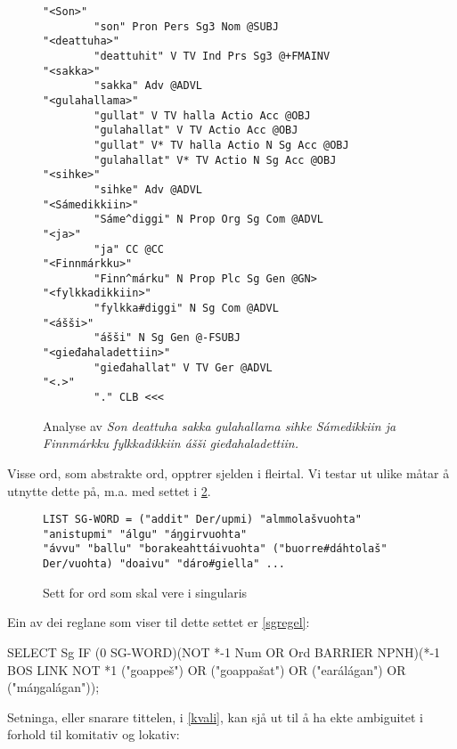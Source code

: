 \documentclass[a4paper,norsk]{article}
\begin{document}
\begin{figure}[htbp]
\begin{center}
\begin{verbatim}
"<Son>"
        "son" Pron Pers Sg3 Nom @SUBJ
"<deattuha>"
        "deattuhit" V TV Ind Prs Sg3 @+FMAINV
"<sakka>"
        "sakka" Adv @ADVL
"<gulahallama>"
        "gullat" V TV halla Actio Acc @OBJ
        "gulahallat" V TV Actio Acc @OBJ
        "gullat" V* TV halla Actio N Sg Acc @OBJ
        "gulahallat" V* TV Actio N Sg Acc @OBJ
"<sihke>"
        "sihke" Adv @ADVL
"<Sámedikkiin>"
        "Sáme^diggi" N Prop Org Sg Com @ADVL
"<ja>"
        "ja" CC @CC
"<Finnmárkku>"
        "Finn^márku" N Prop Plc Sg Gen @GN>
"<fylkkadikkiin>"
        "fylkka#diggi" N Sg Com @ADVL
"<ášši>"
        "ášši" N Sg Gen @-FSUBJ
"<gieđahaladettiin>"
        "gieđahallat" V TV Ger @ADVL
"<.>"
        "." CLB <<<
\end{verbatim}

\caption{Analyse av \emph{Son deattuha sakka gulahallama sihke Sámedikkiin ja Finnmárkku fylkkadikkiin ášši gieđahaladettiin.}}
\label{fylkeanalyse}
\end{center}
\end{figure}

Visse ord, som abstrakte ord, opptrer sjelden i fleirtal. Vi testar ut ulike måtar å utnytte dette på, m.a. med settet i \ref{sgwds}. %


\begin{figure}[htbp]
\begin{center}
\begin{verbatim}
LIST SG-WORD = ("addit" Der/upmi) "almmolašvuohta" "anistupmi" "álgu" "áŋgirvuohta" 
"ávvu" "ballu" "borakeahttáivuohta" ("buorre#dáhtolaš" Der/vuohta) "doaivu" "dáro#giella" ...
\end{verbatim}
\caption{Sett for ord som skal vere i singularis}
\label{sgwds}
\end{center}
\end{figure}

Ein av dei reglane  som viser til dette settet er \ref{sgregel}: %

\begin{example}\label{sgregel}
SELECT Sg IF (0 SG-WORD)(NOT *-1 Num OR Ord BARRIER NPNH)(*-1 BOS LINK NOT *1 ("goappeš") OR ("goappašat") OR ("earálágan") OR ("máŋgalágan"));
\end{example}

Setninga, eller snarare tittelen, i \ref{kvali}, kan sjå ut til å ha ekte ambiguitet i forhold til komitativ og lokativ: %
\end{document}
